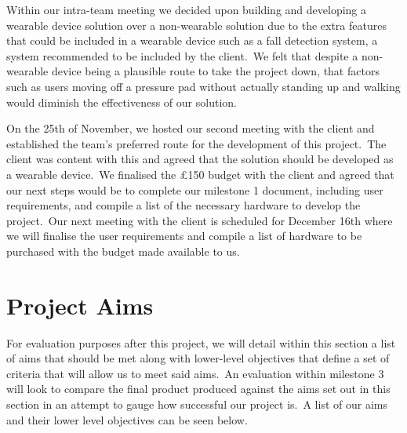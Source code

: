         Within our intra-team meeting we decided upon building and developing a wearable device solution over a
        non-wearable solution due to the extra features that could be included in a wearable device such as a fall
        detection system, a system recommended to be included by the client.\ We felt that despite a non-wearable device
        being a plausible route to take the project down, that factors such as users moving off a pressure
        pad without actually standing up and walking would diminish the effectiveness of our solution.

        On the 25th of November, we hosted our second meeting with the client and established the team's preferred route
        for the development of this project.\ The client was content with this and agreed that the solution should be
        developed as a wearable device.\ We finalised the £150 budget with the client and agreed that our next steps
        would be to complete our milestone 1 document, including user requirements, and compile a list of the necessary
        hardware to develop the project.\ Our next meeting with the client is scheduled for December 16th where we will
        finalise the user requirements and compile a list of hardware to be purchased with the budget made available to
        us.

    \section{Project Aims}
        For evaluation purposes after this project, we will detail within this section a list of aims
        that should be met along with lower-level objectives that define a set of criteria that will allow us to meet
        said aims.\ An evaluation within milestone 3 will look to compare the final product produced against the aims set
        out in this section in an attempt to gauge how successful our project is.\ A list of our aims and their lower
        level objectives can be seen below.

